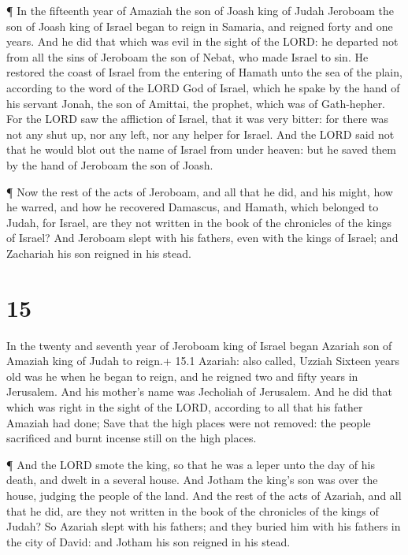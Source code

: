  ¶ In the fifteenth year of Amaziah the son of Joash king
of Judah Jeroboam the son of Joash king of Israel began to reign in
Samaria, and reigned forty and one years.  And he did that
which was evil in the sight of the LORD: he departed not from all the
sins of Jeroboam the son of Nebat, who made Israel to sin. 
He restored the coast of Israel from the entering of Hamath unto the sea
of the plain, according to the word of the LORD God of Israel, which he
spake by the hand of his servant Jonah, the son of Amittai, the prophet,
which was of Gath-hepher.  For the LORD saw the affliction
of Israel, that it was very bitter: for there was not any shut up, nor
any left, nor any helper for Israel.  And the LORD said not
that he would blot out the name of Israel from under heaven: but he
saved them by the hand of Jeroboam the son of Joash.

 ¶ Now the rest of the acts of Jeroboam, and all that he
did, and his might, how he warred, and how he recovered Damascus, and
Hamath, which belonged to Judah, for Israel, are they not written in the
book of the chronicles of the kings of Israel?  And
Jeroboam slept with his fathers, even with the kings of Israel; and
Zachariah his son reigned in his stead.

\hypertarget{section-14}{%
\section{15}\label{section-14}}

 In the twenty and seventh year of Jeroboam king of Israel
began Azariah son of Amaziah king of Judah to reign.+ 15.1 Azariah: also
called, Uzziah  Sixteen years old was he when he began to
reign, and he reigned two and fifty years in Jerusalem. And his mother's
name was Jecholiah of Jerusalem.  And he did that which was
right in the sight of the LORD, according to all that his father Amaziah
had done;  Save that the high places were not removed: the
people sacrificed and burnt incense still on the high places.

 ¶ And the LORD smote the king, so that he was a leper unto
the day of his death, and dwelt in a several house. And Jotham the
king's son was over the house, judging the people of the land.
 And the rest of the acts of Azariah, and all that he did,
are they not written in the book of the chronicles of the kings of
Judah?  So Azariah slept with his fathers; and they buried
him with his fathers in the city of David: and Jotham his son reigned in
his stead.


